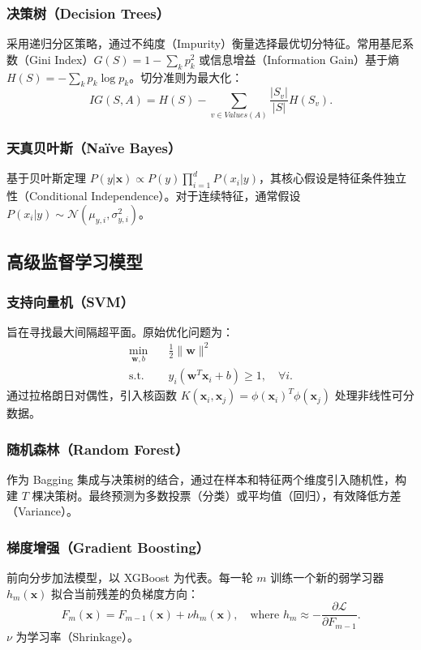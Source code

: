 \documentclass[12pt,a4paper]{ctexart}
\begin{document}
\subsubsection{决策树（Decision Trees）}
采用递归分区策略，通过不纯度（Impurity）衡量选择最优切分特征。常用基尼系数（Gini Index）$G(S) = 1 - \sum_{k} p_k^2$ 或信息增益（Information Gain）基于熵 $H(S) = -\sum_k p_k \log p_k$。切分准则为最大化：
\begin{equation}
    IG(S, A) = H(S) - \sum_{v \in Values(A)} \frac{|S_v|}{|S|} H(S_v).
\end{equation}

\subsubsection{天真贝叶斯（Na\"ive Bayes）}
基于贝叶斯定理 $P(y|\mathbf{x}) \propto P(y) \prod_{i=1}^d P(x_i | y)$，其核心假设是特征条件独立性（Conditional Independence）。对于连续特征，通常假设 $P(x_i|y) \sim \mathcal{N}(\mu_{y,i}, \sigma_{y,i}^2)$。

\subsection{高级监督学习模型}

\subsubsection{支持向量机（SVM）}
旨在寻找最大间隔超平面。原始优化问题为：
\begin{align}
    \min_{\mathbf{w}, b} \quad & \frac{1}{2} \|\mathbf{w}\|^2 \\
    \text{s.t.} \quad & y_i(\mathbf{w}^T \mathbf{x}_i + b) \geq 1, \quad \forall i.
\end{align}
通过拉格朗日对偶性，引入核函数 $K(\mathbf{x}_i, \mathbf{x}_j) = \phi(\mathbf{x}_i)^T \phi(\mathbf{x}_j)$ 处理非线性可分数据。

\subsubsection{随机森林（Random Forest）}
作为 Bagging 集成与决策树的结合，通过在样本和特征两个维度引入随机性，构建 $T$ 棵决策树。最终预测为多数投票（分类）或平均值（回归），有效降低方差（Variance）。

\subsubsection{梯度增强（Gradient Boosting）}
前向分步加法模型，以 XGBoost 为代表。每一轮 $m$ 训练一个新的弱学习器 $h_m(\mathbf{x})$ 拟合当前残差的负梯度方向：
\begin{equation}
    F_m(\mathbf{x}) = F_{m-1}(\mathbf{x}) + \nu h_m(\mathbf{x}), \quad \text{where } h_m \approx -\frac{\partial \mathcal{L}}{\partial F_{m-1}}.
\end{equation}
$\nu$ 为学习率（Shrinkage）。
\end{document}
